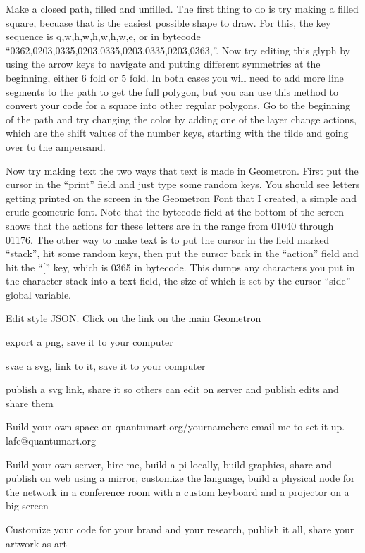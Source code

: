 \documentclass[11pt]{article}
\begin{document}
Make a closed path, filled and unfilled.  The first thing to do is try making a filled square, becuase that is the easiest possible shape to draw.  For this, the key sequence is q,w,h,w,h,w,h,w,e, or in bytecode ``0362,0203,0335,0203,0335,0203,0335,0203,0363,''.  Now try editing this glyph by using the arrow keys to navigate and putting different symmetries at the beginning, either 6 fold or 5 fold.  In both cases you will need to add more line segments to the path to get the full polygon, but you can use this method to convert your code for a square into other regular polygons.  Go to the beginning of the path and try changing the color by adding one of the layer change actions, which are the shift values of the number keys, starting with the tilde and going over to the ampersand.  

Now try making text the two ways that text is made in Geometron.  First put the cursor in the ``print'' field and just type some random keys.  You should see letters getting printed on the screen in the Geometron Font that I created, a simple and crude geometric font.  Note that the bytecode field at the bottom of the screen shows that the actions for these letters are in the range from 01040 through 01176. The other way to make text is to put the cursor in the field marked ``stack'', hit some random keys, then put the cursor back in the ``action'' field and hit the ``['' key, which is 0365 in bytecode.  This dumps any characters you put in the character stack into a text field, the size of which is set by the cursor ``side'' global variable. 

Edit style JSON.  Click on the link on the main Geometron  

export a png, save it to your computer

svae a svg, link to it, save it to your computer

publish a svg link, share it so others can edit on server and publish edits and share them


Build your own space on quantumart.org/yournamehere email me to set it up.  lafe@quantumart.org


Build your own server, hire me, build a pi locally, build graphics, share and publish on web using a mirror, customize the language, build a physical node for the network in a conference room with a custom keyboard and a projector on a big screen 

Customize your code for your brand and your research, publish it all, share your artwork as art 
\end{document}

